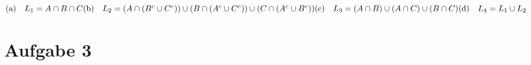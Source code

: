 \documentclass[10pt,a4paper]{article}
\begin{document}
		\begin{math}
			\text{(a)} \quad
			L_1 = A \cap B \cap C
			\\
			\\
			\text{(b)} \quad
			L_2 =
			(A \cap (B^c \cup C^c)) \cup
			(B \cap (A^c \cup C^c)) \cup
			(C \cap (A^c \cup B^c))
			\\
			\\
			\text{(c)} \quad
			L_3 =
			(A \cap B) \cup (A \cap C) \cup (B \cap C)
			\\
			\\
			\text{(d)} \quad
			L_4 = L_1 \cup L_2
		\end{math}

		\begin{flushright}
						\text{$\Box$}
		\end{flushright}

	\newpage

	\section*{Aufgabe 3}
		
\end{document}
